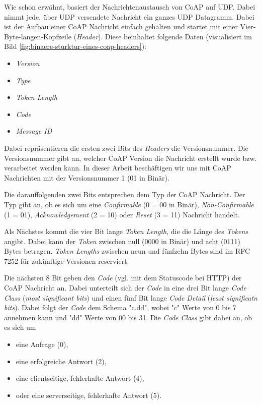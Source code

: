 Wie schon erwähnt, basiert der Nachrichtenaustausch von CoAP auf UDP. Dabei nimmt jede, über UDP versendete Nachricht ein ganzes UDP Datagramm. Dabei ist der Aufbau einer CoAP Nachricht einfach gehalten und startet mit einer Vier-Byte-langen-Kopfzeile (\textit{Header}). Diese beinhaltet folgende Daten (visualisiert im Bild \ref{fig:binaere-sturktur-eines-coap-headers}):
\begin{itemize}
    \item \textit{Version}
    \item \textit{Type}
    \item \textit{Token Length}
    \item \textit{Code}
    \item \textit{Message ID}
\end{itemize}

Dabei repräsentieren die ersten zwei Bits des \textit{Headers} die Versionsnummer. Die Versionsnummer gibt an, welcher CoAP Version die Nachricht erstellt wurde bzw. verarbeitet werden kann. In dieser Arbeit beschäftigen wir uns mit CoAP Nachrichten mit der Versionsnummer 1 (01 in Binär).

Die darauffolgenden zwei Bits entsprechen dem Typ der CoAP Nachricht. Der Typ gibt an, ob es sich um eine \textit{Confirmable} (0 = 00 in Binär), \textit{Non-Confirmable} (1 = 01), \textit{Acknowledgement}  (2 = 10) oder \textit{Reset} (3 = 11) Nachricht handelt.

Als Nächstes kommt die vier Bit lange \textit{Token Length}, die die Länge des \textit{Tokens} angibt. Dabei kann der \textit{Token} zwischen null (0000 in Binär) und acht (0111) Bytes betragen. \textit{Token Lengths} zwischen neun und fünfzehn Bytes sind im RFC 7252 \autocite{RFC7252} für zukünftige Versionen reserviert.

Die nächsten 8 Bit geben den \textit{Code} (vgl. mit dem Statuscode bei HTTP) der CoAP Nachricht an. Dabei unterteilt sich der \textit{Code} in eine drei Bit lange \textit{Code Class} (\textit{most significant bits}) und einen fünf Bit lange \textit{Code Detail} (\textit{least significatn bits}). Dabei folgt der \textit{Code} dem Schema "c.dd", wobei "c" Werte von 0 bis 7 annehmen kann und "dd" Werte von 00 bis 31. Die \textit{Code Class} gibt dabei an, ob es sich um
\begin{itemize}
    \item eine Anfrage (0),
    \item eine erfolgreiche Antwort (2),
    \item eine clientseitige, fehlerhafte Antwort (4),
    \item oder eine serverseitige, fehlerhafte Antwort (5).
\end{itemize}

